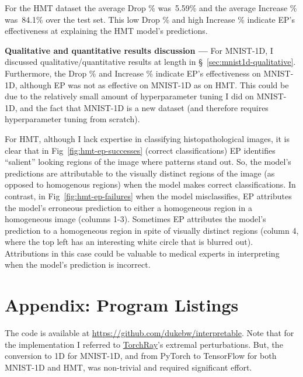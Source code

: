 \documentclass{article}
\newcommand{\myparagraph}[1]{\noindent\textbf{#1 ---}}
\begin{document}
For the HMT dataset the average Drop \% was~\num{5.59}\% and the average Increase \% was~\num{84.1}\% over the test set.
This low Drop \% and high Increase \% indicate EP's effectiveness at explaining the HMT model's predictions.


\myparagraph{Qualitative and quantitative results discussion} For MNIST-1D, I discussed qualitative/quantitative results at length in \S~\ref{sec:mnist1d-qualitative}.
Furthermore, the Drop \% and Increase \% indicate EP's effectiveness on MNIST-1D, although EP was not as effective on MNIST-1D as on HMT\@.
This could be due to the relatively small amount of hyperparameter tuning I did on MNIST-1D, and the fact that MNIST-1D is a new dataset (and therefore requires hyperparameter tuning from scratch).

For HMT, although I lack expertise in classifying histopathological images, it is clear that in Fig~\ref{fig:hmt-ep-successes} (correct classifications) EP identifies ``salient'' looking regions of the image where patterns stand out.
So, the model's predictions are attributable to the visually distinct regions of the image (as opposed to homogenous regions) when the model makes correct classifications.
In contrast, in Fig~\ref{fig:hmt-ep-failures} when the model misclassifies, EP attributes the model's erroneous prediction to either a homogeneous region in a homogeneous image (columns 1-3).
Sometimes EP attributes the model's prediction to a homogeneous region in spite of visually distinct regions (column 4, where the top left has an interesting white circle that is blurred out).
Attributions in this case could be valuable to medical experts in interpreting when the model's prediction is incorrect.


\clearpage
\appendix
\section{Appendix: Program Listings}

The code is available at \url{https://github.com/dukebw/interpretable}.
Note that for the implementation I referred to \hyperlink{https://github.com/facebookresearch/TorchRay}{TorchRay}'s extremal perturbations.
But, the conversion to 1D for MNIST-1D, and from PyTorch to TensorFlow for both MNIST-1D and HMT, was non-trivial and required significant effort.

\small


\end{document}

